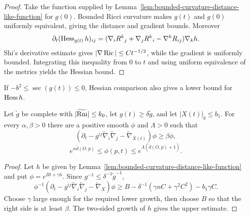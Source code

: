 \begin{proof}
Take the function supplied by
Lemma~\ref{lem:bounded-curvature-distance-like-function} for $g(0)$.  Bounded
Ricci curvature makes $g(t)$ and $g(0)$ uniformly equivalent, giving the
distance and gradient bounds.  Moreover
\[
\partial_t(\operatorname{Hess}_{g(t)}h)_{ij}
=(\nabla_iR^k{}_j+\nabla_jR^k{}_i-\nabla^kR_{ij})\nabla_kh.
\]
Shi's derivative estimate gives $|\nabla\operatorname{Ric}|\leq C t^{-1/2}$, while the
gradient is uniformly bounded.  Integrating this inequality from $0$ to $t$
and using uniform equivalence of the metrics yields the Hessian bound.
\end{proof}

\begin{remark}
\label{rem:distance-like-hessian-lower-bound}
If $-b^2\leq\sec(g(t))\leq0$, Hessian comparison also gives a lower bound for
$\operatorname{Hess} h$.
\end{remark}

\begin{lemma}
\label{lem:general-metric-barrier-supersolution}
Let $\widetilde g$ be complete with $|\widetilde{\operatorname{Rm}}|\leq k_0$, let
$g(t)\geq\delta\widetilde g$, and let $|X(t)|_{\widetilde g}\leq b_1$.  For
every $\alpha,\beta>0$ there are a positive smooth $\phi$ and $\Lambda>0$ such
that
\[
(\partial_t-g^{ij}\widetilde\nabla_i\widetilde\nabla_j
-\widetilde\nabla_{X(t)})\phi\geq\beta\phi,
\]
\[
e^{\alpha\widetilde d(O,p)}\leq\phi(p,t)
 \leq e^{\Lambda(\widetilde d(O,p)+1)}.
\]
\end{lemma}

\begin{proof}
Let $h$ be given by Lemma~\ref{lem:bounded-curvature-distance-like-function}
and put $\phi=e^{Bt+\gamma h}$.  Since $g^{-1}\leq\delta^{-1}\widetilde
g^{-1}$,
\[
\phi^{-1}(\partial_t-g^{ij}\widetilde\nabla_i\widetilde\nabla_j
-\widetilde\nabla_X)\phi
\geq B-\delta^{-1}(\gamma nC+\gamma^2C^2)-b_1\gamma C.
\]
Choose $\gamma$ large enough for the required lower growth, then choose $B$
so that the right side is at least $\beta$.  The two-sided growth of $h$
gives the upper estimate.
\end{proof}

